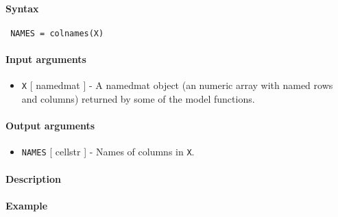 


	\paragraph{Syntax}
 
 \begin{verbatim}
 NAMES = colnames(X)
 \end{verbatim}
 
 \paragraph{Input arguments}
 
 \begin{itemize}
 \item
   \texttt{X} {[} namedmat {]} - A namedmat object (an numeric array with
   named rows and columns) returned by some of the model functions.
 \end{itemize}
 
 \paragraph{Output arguments}
 
 \begin{itemize}
 \item
   \texttt{NAMES} {[} cellstr {]} - Names of columns in \texttt{X}.
 \end{itemize}
 
 \paragraph{Description}
 
 \paragraph{Example}



